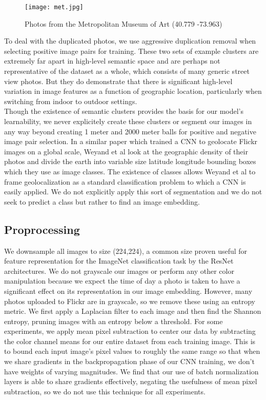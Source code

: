 \documentclass[pageno]{jpaper}
\begin{document}
\begin{figure}[!htbp]
  \centering
  \texttt{[image: met.jpg]}
  \caption{Photos from the Metropolitan Museum of Art (40.779 -73.963)}
  \label{fig:met}
\end{figure}

To deal with the duplicated photos, we use aggressive duplication removal when selecting positive image pairs for training. These two sets of example clusters are extremely far apart in high-level semantic space and are perhaps not representative of the dataset as a whole, which consists of many generic street view photos. But they do demonstrate that there is significant high-level variation in image features as a function of geographic location, particularly when switching from indoor to outdoor settings.\\

Though the existence of semantic clusters provides the basis for our model's learnability, we never explicitely create these clusters or segment our images in any way beyond creating 1 meter and 2000 meter balls for positive and negative image pair selection. In a similar paper which trained a CNN to geolocate Flickr images on a global scale, Weyand et al look at the geographic density of their photos and divide the earth into variable size latitude longitude bounding boxes which they use as image classes.\cite{weyand2016planet} The existence of classes allows Weyand et al to frame geolocalization as a standard classification problem to which a CNN is easily applied. We do not explicitly apply this sort of segmentation and we do not seek to predict a class but rather to find an image embedding.

\subsection{Proprocessing}
We downsample all images to size (224,224), a common size proven useful for feature representation for the ImageNet classification task by the ResNet architectures.\cite{He2015} We do not grayscale our images or perform any other color manipulation because we expect the time of day a photo is taken to have a significant effect on its representation in our image embedding. However, many photos uploaded to Flickr are in grayscale, so we remove these using an entropy metric. We first apply a Laplacian filter to each image and then find the Shannon entropy, pruning images with an entropy below a threshold. For some experiments, we apply mean pixel subtraction to center our data by subtracting the color channel means for our entire dataset from each training image. This is to bound each input image's pixel values to roughly the same range so that when we share gradients in the backpropagation phase of our CNN training, we don't have weights of varying magnitudes. We find that our use of batch normalization layers is able to share gradients effectively, negating the usefulness of mean pixel subtraction, so we do not use this technique for all experiments.
\end{document}

